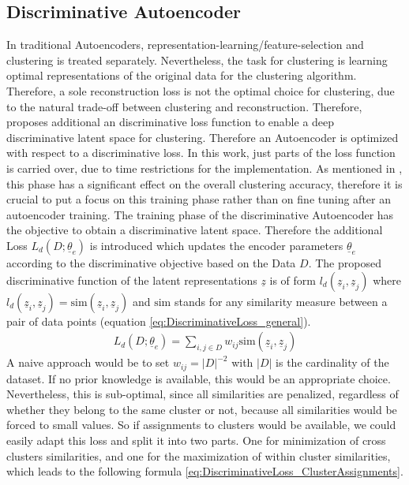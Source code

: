 \documentclass[12pt,DIV14,BCOR12mm,a4paper,footexclude,headinclude,halfparskip-,twoside,openright,cleardoubleempty,idxtotoc,bibtotoc,listtotoc]{scrreprt} %
\numberwithin{equation}{chapter}
\begin{document}
\subsection{Discriminative Autoencoder}
In traditional Autoencoders, representation-learning/feature-selection and clustering is treated separately. Nevertheless, the task for clustering is learning optimal representations of the original data for the clustering algorithm. Therefore, a sole reconstruction loss is not the optimal choice for clustering, due to the natural trade-off between clustering and reconstruction. Therefore, \cite{DiscriminativeClustering} proposes additional an discriminative loss function to enable a deep discriminative latent space for clustering. Therefore an Autoencoder is optimized with respect to a discriminative loss. In this work, just parts of the loss function is carried over, due to time restrictions for the implementation. As mentioned in \cite{DiscriminativeClustering}, this phase has a significant effect on the overall clustering accuracy, therefore it is crucial to put a focus on this training phase rather than on fine tuning after an autoencoder training. The training phase of the discriminative Autoencoder has the objective to obtain a discriminative latent space. Therefore the additional Loss $L_d(D;\underline{\theta}_e)$ is introduced which updates the encoder parameters $\underline{\theta}_e$ according to the discriminative objective based on the Data $D$. The proposed discriminative function of the latent representations $\underline{z}$ is of form $l_d(\underline{z}_i, \underline{z}_j)$ where $l_d(\underline{z}_i, \underline{z}_j) = \textrm{sim}(\underline{z}_i,\underline{z}_j)$ and $\textrm{sim}$ stands for any similarity measure between a pair of data points (equation \ref{eq:DiscriminativeLoss_general}).
\begin{align}
	 L_d(D;\underline{\theta}_e) = \sum_{i,j \in D}w_{ij}\textrm{sim}(\underline{z}_i,\underline{z}_j)\label{eq:DiscriminativeLoss_general}
\end{align}
A naive approach would be to set $w_{ij} = |D|^{-2}$ with $|D|$ is the cardinality of the dataset. If no prior knowledge is available, this would be an appropriate choice. Nevertheless, this is sub-optimal, since all similarities are penalized, regardless of whether they belong to the same cluster or not, because all similarities would be forced to small values. So if assignments to clusters would be available, we could easily adapt this loss and split it into two parts. One for minimization of cross clusters similarities, and one for the maximization of within cluster similarities, which leads to the following formula \ref{eq:DiscriminativeLoss_ClusterAssignments}.
\end{document}
